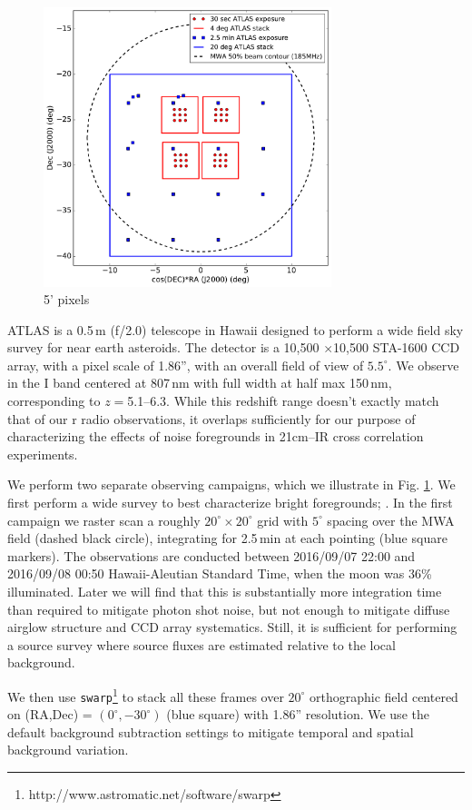 \documentclass{emulateapj}
\begin{document}
\begin{figure}[h]
\centering
\includegraphics[width=3.3in]{images/survey_overview.pdf}
\caption{5' pixels}
\label{fig:surveyoverview}
\end{figure}

ATLAS is a 0.5\,m (f/2.0) telescope \citep{tonry11} in Hawaii designed to perform a wide field sky survey for near earth asteroids. The detector is a 10,500 $\times$10,500 STA-1600 CCD array, with a pixel scale of 1.86'', with an overall field of view of $5.5^\circ$. We observe in the I band centered at 807\,nm with full width at half max 150\,nm, corresponding to $z=$5.1--6.3. While this redshift range doesn't exactly match that of our r radio observations, it overlaps sufficiently for our purpose of characterizing the effects of noise foregrounds in 21cm--IR cross correlation experiments. 

We perform two separate observing campaigns, which we illustrate in Fig. \ref{fig:surveyoverview}. We first perform a wide survey to best characterize bright foregrounds; . In the first campaign we raster scan a roughly $20^\circ\times20^\circ$ grid with $5^\circ$ spacing over the MWA field (dashed black circle), integrating for 2.5\,min at each pointing (blue square markers). The observations are conducted between 2016/09/07 22:00  and 2016/09/08 00:50 Hawaii-Aleutian Standard Time, when the moon was 36\% illuminated.  Later we will find that this is substantially more integration time than required to mitigate photon shot noise, but not enough to mitigate diffuse airglow structure and CCD array systematics. Still, it is sufficient for performing a source survey where source fluxes are estimated relative to the local background. 

We then use {\tt swarp}\footnote{http://www.astromatic.net/software/swarp} \citep{swarp} to stack all these frames over $20^\circ$ orthographic field centered on (RA,Dec) = $(0^\circ,-30^\circ)$ (blue square) with 1.86'' resolution. We use the default background subtraction settings to mitigate temporal and spatial background variation. 
\end{document}
